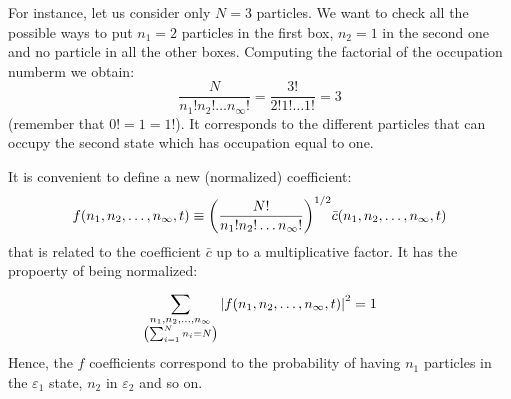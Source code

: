 \documentclass[../main/main.tex]{subfiles}
\begin{document}

\begin{example}{}{}
For instance, let us consider only \( N=3 \) particles. We want to check all the possible ways to put \( n_1 =2 \)  particles in the first box, \( n_2 =1 \) in the second one and no particle in all the other boxes.
Computing the factorial of the occupation numberm we obtain:
\begin{equation*}
  \frac{N}{n_1!n_2! \dots n_ \infty !} = \frac{3!}{2!1!\dots1!} = 3
\end{equation*}
(remember that \( 0! = 1 = 1! \)). It corresponds to the different particles that can occupy the second state which has occupation equal to one.
\end{example}

It is convenient to define a new (normalized) coefficient:  
\begin{equation}
  f(n_1,n_2,\dots,n_ \infty , t) \equiv \qty(\frac{N!}{n_1!n_2! \dots n_ \infty !})^{1/2} \bar{c} (n_1,n_2,\dots,n_ \infty ,t)
\end{equation}
that is related to the coefficient \( \bar{c}  \) up to a multiplicative factor. It has the propoerty of being normalized:
\begin{equation*}
  \sum_{\substack{n_1,n_2, \dots,n_ \infty  \\ \qty(\sum_{i=1}^{N} n_i = N ) } }^{} \abs{f(n_1,n_2,\dots,n_ \infty , t) }^2 = 1
\end{equation*}
Hence, the \( f \) coefficients correspond to the probability of having \( n_1 \) particles in the \( \varepsilon _1  \) state, \( n_2 \) in \( \varepsilon _2 \) and so on.
\end{document}
